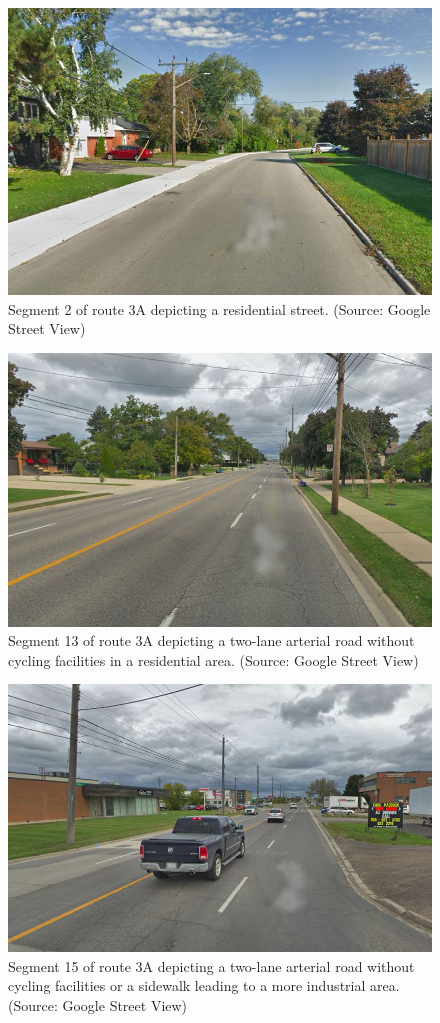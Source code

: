 \documentclass[]{elsarticle} %
\begin{document}
\begin{figure}

{\centering \includegraphics[width=0.65\linewidth]{Figure 23} 

}

\caption{Segment 2 of route 3A depicting a residential street. (Source: Google Street View)}\label{fig:figure-24}
\end{figure}

\begin{figure}

{\centering \includegraphics[width=0.65\linewidth]{Figure 24} 

}

\caption{Segment 13 of route 3A depicting a two-lane arterial road without cycling facilities in a residential area. (Source: Google Street View)}\label{fig:figure-25}
\end{figure}

\begin{figure}

{\centering \includegraphics[width=0.65\linewidth]{Figure 25} 

}

\caption{Segment 15 of route 3A depicting a two-lane arterial road without cycling facilities or a sidewalk leading to a more industrial area. (Source: Google Street View)}\label{fig:figure-26}
\end{figure}
\end{document}

